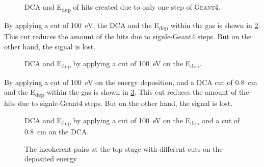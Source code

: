\documentclass{article}
\begin{document}
\begin{figure}[h]
\centering
{}
\hfil
{}
\caption{DCA and E\textsubscript{dep} of hits created due to only one step of \textsc{Geant4}.}
\label{1hit_DCA_Edep}
\end{figure}

By applying a cut of 100~eV, the DCA and the E\textsubscript{dep} within the gas is shown in \cref{DCA_Edep_100eVcut}. This cut reduces the amount of the hits due to signle-Geant4 steps. But on the other hand, the signal is lost.

\begin{figure}[h]
\centering
{}
\hfil
{}
\caption{DCA and E\textsubscript{dep} by applying a cut of 100~eV on the E\textsubscript{dep}.}
\label{DCA_Edep_100eVcut}
\end{figure}

By applying a cut of 100~eV on the energy deposition, and a DCA cut of 0.8~cm and the E\textsubscript{dep} within the gas is shown in \cref{DCA_Edep_100eVcut_8mmDCA}. This cut reduces the amount of the hits due to signle-Geant4 steps. But on the other hand, the signal is lost.

\begin{figure}[h]
\centering
{}
\hfil
{}
\caption{DCA and E\textsubscript{dep} by applying a cut of 100~eV on the E\textsubscript{dep} and a cut of 0.8~cm on the DCA.}
\label{DCA_Edep_100eVcut_8mmDCA}
\end{figure}


\begin{figure}[h]
\centering
{}
\hfil
{}
\hfil
{}
\caption{The incoherent pairs at the top stage with different cuts on the deposited energy}
\label{top_incoherent_Ecu}
\end{figure}
\end{document}
